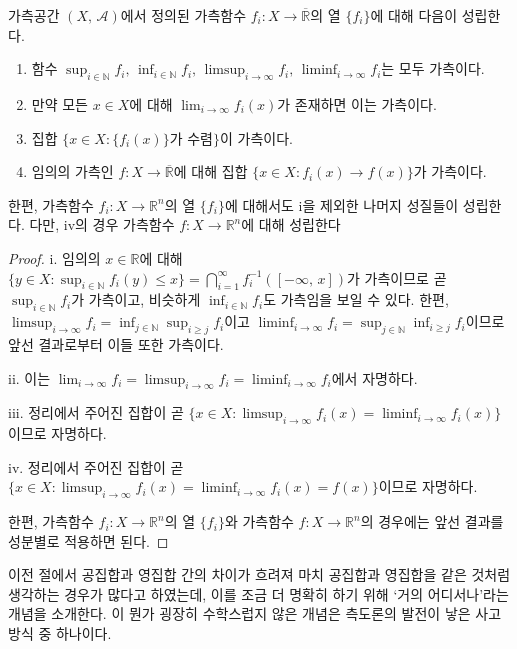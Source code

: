 \begin{theorem}\label{thm:limitMeasurable}
    가측공간 $(X,\,\mathcal{A})$에서 정의된 가측함수 $f_i:X\to\overline{\mathbb{R}}$의 열 $\{f_i\}$에 대해 다음이 성립한다.
    \begin{enumerate}
        \item 함수 $\sup_{i\in\mathbb{N}}f_i,\,\inf_{i\in\mathbb{N}}f_i,\,\limsup_{i\to\infty}f_i,\,\liminf_{i\to\infty}f_i$는 모두 가측이다.
        \item 만약 모든 $x\in X$에 대해 $\lim_{i\to\infty}f_i(x)$가 존재하면 이는 가측이다.
        \item 집합 $\{x\in X:\{f_i(x)\}\textrm{가 수렴}\}$이 가측이다.
        \item 임의의 가측인 $f:X\to\overline{\mathbb{R}}$에 대해 집합 $\{x\in X:f_i(x)\to f(x)\}$가 가측이다.
    \end{enumerate}
    한편, 가측함수 $f_i:X\to\mathbb{R}^n$의 열 $\{f_i\}$에 대해서도 i을 제외한 나머지 성질들이 성립한다. 다만, iv의 경우 가측함수 $f:X\to\mathbb{R}^n$에 대해 성립한다
\end{theorem}

\begin{proof}
    i. 임의의 $x\in\mathbb{R}$에 대해 $\{y\in X:\sup_{i\in\mathbb{N}}f_i(y)\leq x\}=\bigcap_{i=1}^\infty f_i^{-1}([-\infty,\,x])$가 가측이므로 곧 $\sup_{i\in\mathbb{N}}f_i$가 가측이고, 비슷하게 $\inf_{i\in\mathbb{N}}f_i$도 가측임을 보일 수 있다. 한편, $\limsup_{i\to\infty}f_i=\inf_{j\in\mathbb{N}}\sup_{i\geq j}f_i$이고 $\liminf_{i\to\infty}f_i=\sup_{j\in\mathbb{N}}\inf_{i\geq j}f_i$이므로 앞선 결과로부터 이들 또한 가측이다.

    ii. 이는 $\lim_{i\to\infty}f_i=\limsup_{i\to\infty}f_i=\liminf_{i\to\infty}f_i$에서 자명하다.

    iii. 정리에서 주어진 집합이 곧 $\{x\in X:\limsup_{i\to\infty}f_i(x)=\liminf_{i\to\infty}f_i(x)\}$이므로 자명하다.

    iv.  정리에서 주어진 집합이 곧 $\{x\in X:\limsup_{i\to\infty}f_i(x)=\liminf_{i\to\infty}f_i(x)=f(x)\}$이므로 자명하다.

    한편, 가측함수 $f_i:X\to\mathbb{R}^n$의 열 $\{f_i\}$와 가측함수 $f:X\to\mathbb{R}^n$의 경우에는 앞선 결과를 성분별로 적용하면 된다.
\end{proof}

이전 절에서 공집합과 영집합 간의 차이가 흐려져 마치 공집합과 영집합을 같은 것처럼 생각하는 경우가 많다고 하였는데, 이를 조금 더 명확히 하기 위해 `거의 어디서나'라는 개념을 소개한다. 이 뭔가 굉장히 수학스럽지 않은 개념은 측도론의 발전이 낳은 사고방식 중 하나이다.

